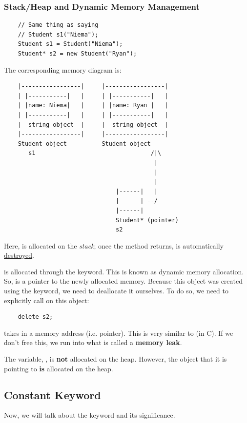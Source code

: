 \documentclass[letterpaper]{article}
\begin{document}
\subsubsection{Stack/Heap and Dynamic Memory Management}
\begin{verbatim}
    // Same thing as saying 
    // Student s1("Niema");
    Student s1 = Student("Niema");
    Student* s2 = new Student("Ryan");
\end{verbatim}
The corresponding memory diagram is: 
\begin{verbatim}
    |-----------------|     |-----------------|
    | |-----------|   |     | |-----------|   |
    | |name: Niema|   |     | |name: Ryan |   |
    | |-----------|   |     | |-----------|   |
    |  string object  |     |  string object  |
    |-----------------|     |-----------------|
    Student object          Student object 
       s1                                 /|\
                                           |
                                           |
                                           |
                                |------|   |
                                |      | --/
                                |------|
                                Student* (pointer)
                                s2
\end{verbatim}
Here,  is allocated on the \emph{stack}; once the method returns,  is automatically \underline{destroyed}.

\bigskip 

 is allocated through the  keyword. This is known as dynamic memory allocation. So,  is a pointer to the newly allocated memory. Because this object was created using the  keyword, we need to deallocate it ourselves. To do so, we need to explicitly call  on this object: 
\begin{verbatim}
    delete s2; 
\end{verbatim}
 takes in a memory address (i.e. pointer). This is very similar to  (in C). If we don't free this, we run into what is called a \textbf{memory leak}. 

\bigskip 

The variable, , is \textbf{not} allocated on the heap. However, the object that it is pointing to \textbf{is} allocated on the heap. 

\subsection{Constant Keyword}
Now, we will talk about the  keyword and its significance. 
\end{document}
